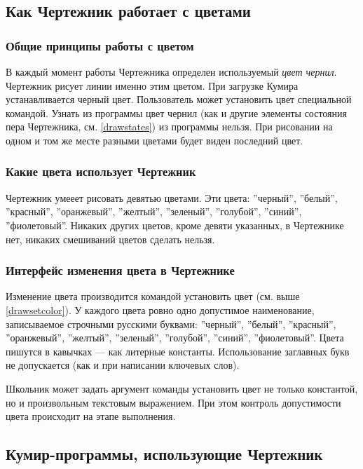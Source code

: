 \subsection{Как Чертежник работает с цветами}
\label{drawcolors}

\subsubsection{Общие принципы работы с цветом}

	В каждый момент работы Чертежника определен используемый \emph{цвет чернил}. Чертежник рисует линии именно этим цветом. При загрузке Кумира устанавливается черный цвет. 	Пользователь может установить цвет специальной командой. Узнать из программы цвет чернил (как и другие элементы состояния пера Чертежника, см. \ref{drawstates}) из программы нельзя. При рисовании на одном и том же месте разными цветами будет виден последний цвет. 

\subsubsection{Какие цвета использует Чертежник}

	Чертежник умееет рисовать девятью цветами. Эти цвета: \mbox{''черный''}, ''белый'', ''красный'', ''оранжевый'', ''желтый'', ''зеленый'', ''голубой'', ''синий'', ''фиолетовый''. Никаких других цветов, кроме девяти указанных, в Чертежнике нет,  никаких смешиваний цветов сделать нельзя.

\subsubsection{Интерфейс изменения цвета в Чертежнике}

	Изменение цвета производится командой \textsf{установить цвет} (см. выше \ref{drawsetcolor}).
У каждого цвета ровно одно допустимое наименование, записываемое строчными русскими буквами:  \mbox{''черный''}, ''белый'', ''красный'', ''оранжевый'', ''желтый'', ''зеленый'', ''голубой'', ''синий'', ''фиолетовый''. Цвета пишутся в кавычках --- как литерные константы. Использование заглавных букв не допускается (как и при написании ключевых слов).

	Школьник может задать аргумент команды \textsf{установить цвет} не только константой, но и произвольным текстовым выражением. При этом контроль допустимости цвета происходит на этапе выполнения.


\subsection{Кумир-программы, использующие Чертежник}

